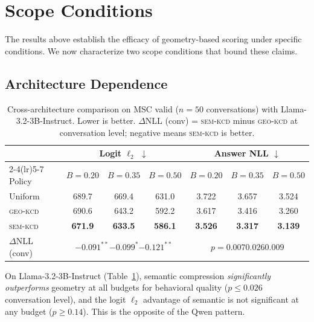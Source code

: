 \documentclass[11pt]{article}
\newcommand{\geokcd}{\textsc{geo-kcd}}
\newcommand{\semkcd}{\textsc{sem-kcd}}
\begin{document}
\section{Scope Conditions}
\label{sec:scope}

The results above establish the efficacy of geometry-based scoring
under specific conditions.
We now characterize two scope conditions that bound these claims.

\subsection{Architecture Dependence}

\begin{table}[t]
\centering
\caption{Cross-architecture comparison on MSC valid ($n{=}50$ conversations)
with Llama-3.2-3B-Instruct.
Lower is better. $\Delta$NLL (conv) = \semkcd{} minus \geokcd{} at conversation
level; negative means \semkcd{} is better.}
\label{tab:llama}
\setlength{\tabcolsep}{4.5pt}
\begin{tabular}{lcccccc}
\toprule
& \multicolumn{3}{c}{Logit $\ell_2$ $\downarrow$} & \multicolumn{3}{c}{Answer NLL $\downarrow$} \\
\cmidrule(lr){2-4}\cmidrule(lr){5-7}
Policy & $B{=}0.20$ & $B{=}0.35$ & $B{=}0.50$ & $B{=}0.20$ & $B{=}0.35$ & $B{=}0.50$ \\
\midrule
Uniform   & 689.7 & 669.4 & 631.0 & 3.722 & 3.657 & 3.524 \\
\geokcd{} & 690.6 & 643.2 & 592.2 & 3.617 & 3.416 & 3.260 \\
\semkcd{} & \textbf{671.9} & \textbf{633.5} & \textbf{586.1} & \textbf{3.526} & \textbf{3.317} & \textbf{3.139} \\
\midrule
$\Delta$NLL (conv) & \multicolumn{3}{c}{$-0.091^{**}$\;$-0.099^{*}$\;$-0.121^{**}$}
                   & \multicolumn{3}{c}{$p = 0.007$\;$0.026$\;$0.009$} \\
\bottomrule
\end{tabular}
\end{table}

On Llama-3.2-3B-Instruct (Table~\ref{tab:llama}),
semantic compression \emph{significantly outperforms} geometry at all budgets
for behavioral quality ($p \leq 0.026$ conversation level),
and the logit $\ell_2$ advantage of semantic is not significant at any budget
($p \geq 0.14$).
This is the opposite of the Qwen pattern.
\end{document}
